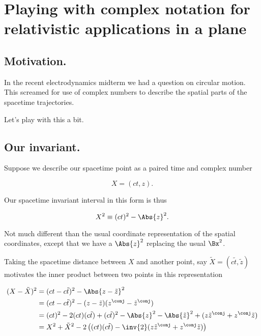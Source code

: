
%

\chapter{Playing with complex notation for relativistic applications in a plane}
\label{chap:complexPlanarBoost}
{}
\date{Mar 8, 2011}

\beginArtWithToc

\section{Motivation.}

In the recent electrodynamics midterm we had a question on circular motion.  This screamed for use of complex numbers to describe the spatial parts of the spacetime trajectories.

Let's play with this a bit.

\section{Our invariant.}

Suppose we describe our spacetime point as a paired time and complex number

\begin{equation}\label{eqn:complexPlanarBoost:10}
X = (ct, z).
\end{equation}

Our spacetime invariant interval in this form is thus

\begin{equation}\label{eqn:complexPlanarBoost:30}
X^2 \equiv (ct)^2 - \Abs{z}^2.
\end{equation}

Not much different than the usual coordinate representation of the spatial coordinates, except that we have a $\Abs{z}^2$ replacing the usual $\Bx^2$.

Taking the spacetime distance between $X$ and another point, say $\tilde{X} = ( c \tilde{t}, \tilde{z})$ motivates the inner product between two points in this representation

\begin{align*}
(X - \tilde{X})^2 
&= (ct - c \tilde{t})^2 - \Abs{z - \tilde{z}}^2 \\
&= (ct - c \tilde{t})^2 - (z - \tilde{z})(z^\conj - \tilde{z}^\conj) \\
&= (ct)^2 - 2 (ct) (c \tilde{t}) + (c \tilde{t})^2 
- \Abs{z}^2 - \Abs{\tilde{z}}^2 + (z \tilde{z}^\conj + z^\conj \tilde{z}) \\
&= X^2 + \tilde{X}^2 - 2 \left( (ct) (c \tilde{t}) - \inv{2}(z \tilde{z}^\conj + z^\conj \tilde{z}) \right) \\
\end{align*}

